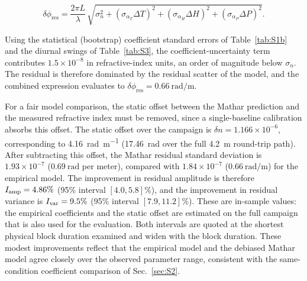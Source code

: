 \documentclass[aps,prapplied,reprint,superscriptaddress]{revtex4-2}
\begin{document}
\begin{equation}
\delta\phi_{\text{res}} = \frac{2\pi L}{\lambda}\,
  \sqrt{\sigma_n^{2} 
  + (\sigma_{\alpha_T}\Delta T)^2 
  + (\sigma_{\alpha_H}\Delta H)^2 
  + (\sigma_{\alpha_P}\Delta P)^2}.
\end{equation}

Using the statistical (bootstrap) coefficient standard errors of Table~\ref{tab:S1b} and the diurnal swings of Table~\ref{tab:S3}, the coefficient-uncertainty term contributes $1.5 \times 10^{-8}$ in refractive-index units, an order of magnitude below $\sigma_n$. The residual is therefore dominated by the residual scatter of the model, and the combined expression evaluates to $\delta\phi_{\text{res}} = \SI{0.66}{\radian\per\meter}$.

For a fair model comparison, the static offset between the Mathar prediction and the measured refractive index must be removed, since a single-baseline calibration absorbs this offset. The static offset over the campaign is $\delta n = 1.166 \times 10^{-6}$, corresponding to \SI{4.16}{\radian\per\meter} (\SI{17.46}{\radian} over the full \SI{4.2}{\meter} round-trip path). After subtracting this offset, the Mathar residual standard deviation is $1.93 \times 10^{-7}$ ($\SI{0.69}{\radian}$ per meter), compared with $1.84 \times 10^{-7}$ ($\SI{0.66}{\radian\per\meter}$) for the empirical model. The improvement in residual amplitude is therefore $I_{\rm amp} = 4.86\%$ (95\% interval $[4.0, 5.8]\%$), and the improvement in residual variance is $I_{\rm var} = 9.5\%$ (95\% interval $[7.9, 11.2]\%$). These are in-sample values: the empirical coefficients and the static offset are estimated on the full campaign that is also used for the evaluation. Both intervals are quoted at the shortest physical block duration examined and widen with the block duration. These modest improvements reflect that the empirical model and the debiased Mathar model agree closely over the observed parameter range, consistent with the same-condition coefficient comparison of Sec.~\ref{sec:S2}.
\end{document}
